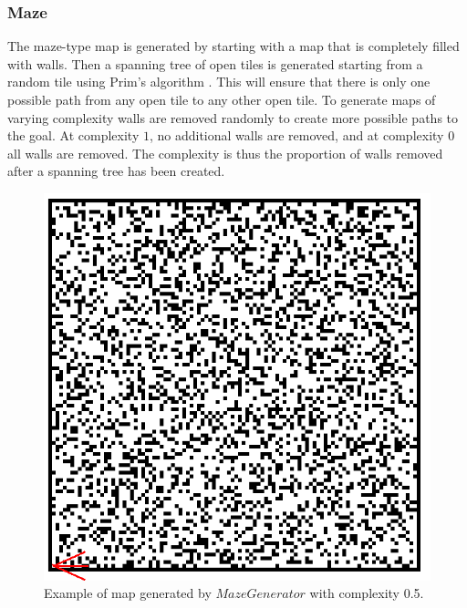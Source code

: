 \subsubsection{Maze}
The maze-type map is generated by starting with a map that is completely filled with walls. Then a spanning tree of open tiles is generated starting from a random tile using Prim's algorithm \cite{graham1985history}. This will ensure that there is only one possible path from any open tile to any other open tile. To generate maps of varying complexity walls are removed randomly to create more possible paths to the goal. At complexity $1$, no additional walls are removed, and at complexity $0$ all walls are removed. The complexity is thus the proportion of walls removed after a spanning tree has been created.
\begin{figure}[H]
\centering
\includegraphics[width=\columnwidth]{images/maze05.png}
\caption{Example of map generated by $MazeGenerator$ with complexity 0.5.}
\label{fig:maze05}
\end{figure}

